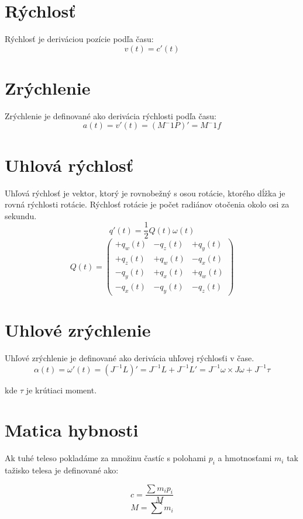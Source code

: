 \documentclass[paper=a4, fontsize=11pt]{scrartcl} %
\numberwithin{equation}{section} %
\numberwithin{figure}{section} %
\numberwithin{table}{section} %
\begin{document}
\section{Rýchlosť}
Rýchlosť je deriváciou pozície podľa času: $$v(t) = c'(t)$$

\section{Zrýchlenie}
Zrýchlenie je definované ako derivácia rýchlosti podľa času:
$$ a(t) = v'(t) = (M^-1P)' = M^-1f$$

\section{Uhlová rýchlosť}
Uhľová rýchlosť je vektor, ktorý je rovnobežný s osou rotácie, ktorého dĺžka je  rovná rýchlosti rotácie. Rýchlosť rotácie je počet radiánov otočenia okolo osi za sekundu.
$$ q'(t) = \frac{1}{2}Q(t)\omega(t)$$
$$
Q(t) =
\begin{pmatrix}
+q_{w}(t) 	&	-q_{z}(t) 	&	+q_{y}(t)\\
+q_{z}(t) 	&	+q_{w}(t) 	&	-q_{x}(t)\\
-q_{y}(t) 	&	+q_{x}(t) 	&	+q_{w}(t)\\
-q_{x}(t) 	&	-q_{y}(t) 	&	-q_{z}(t)
\end{pmatrix}
$$

\section{Uhlové zrýchlenie}
Uhľové zrýchlenie je definované ako derivácia uhľovej rýchlosťi v čase.
$$\alpha(t) = \omega'(t) = (J^{-1}L)' = J^{-1}L + J^{-1}L' = J^{-1}\omega \times J\omega + J^{-1} \tau $$

kde $\tau$ je krútiaci moment.

\section{Matica hybnosti}
Ak tuhé teleso pokladáme za množinu častíc s polohami $p_i$ a hmotnosťami $m_i$ tak tažisko
telesa je definované ako:

$$ c = \frac{\sum m_i p_i}{M} $$
$$ M = \sum m_i $$
\end{document}
